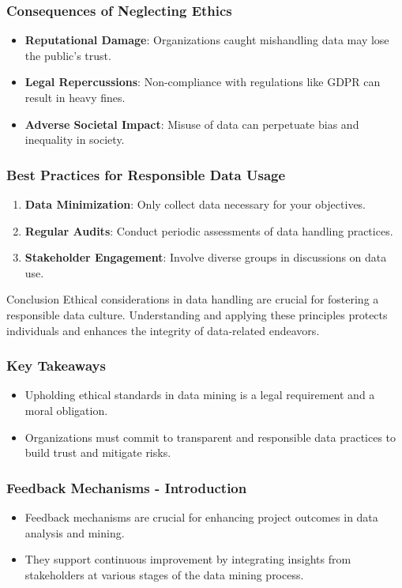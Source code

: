 \documentclass[aspectratio=169]{beamer}
\begin{document}
\begin{frame}[fragile]
    \frametitle{Consequences of Neglecting Ethics}
    \begin{itemize}
        \item \textbf{Reputational Damage}: Organizations caught mishandling data may lose the public's trust.
        \item \textbf{Legal Repercussions}: Non-compliance with regulations like GDPR can result in heavy fines.
        \item \textbf{Adverse Societal Impact}: Misuse of data can perpetuate bias and inequality in society.
    \end{itemize}
\end{frame}

\begin{frame}[fragile]
    \frametitle{Best Practices for Responsible Data Usage}
    \begin{enumerate}
        \item \textbf{Data Minimization}: Only collect data necessary for your objectives.
        \item \textbf{Regular Audits}: Conduct periodic assessments of data handling practices.
        \item \textbf{Stakeholder Engagement}: Involve diverse groups in discussions on data use.
    \end{enumerate}

    \begin{block}{Conclusion}
        Ethical considerations in data handling are crucial for fostering a responsible data culture. Understanding and applying these principles protects individuals and enhances the integrity of data-related endeavors.
    \end{block}
\end{frame}

\begin{frame}[fragile]
    \frametitle{Key Takeaways}
    \begin{itemize}
        \item Upholding ethical standards in data mining is a legal requirement and a moral obligation.
        \item Organizations must commit to transparent and responsible data practices to build trust and mitigate risks.
    \end{itemize}
\end{frame}

\begin{frame}[fragile]
    \frametitle{Feedback Mechanisms - Introduction}
    \begin{itemize}
        \item Feedback mechanisms are crucial for enhancing project outcomes in data analysis and mining.
        \item They support continuous improvement by integrating insights from stakeholders at various stages of the data mining process.
    \end{itemize}
\end{frame}
\end{document}
